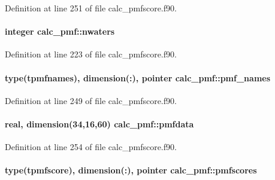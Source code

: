 Definition at line 251 of file calc\-\_\-pmfscore.\-f90.

\hypertarget{classcalc__pmf_a4232eda1705ffe1f555323f262740595}{
\paragraph[{nwaters}]{\setlength{\rightskip}{0pt plus 5cm}integer calc\-\_\-pmf\-::nwaters}}\label{classcalc__pmf_a4232eda1705ffe1f555323f262740595}


Definition at line 223 of file calc\-\_\-pmfscore.\-f90.

\hypertarget{classcalc__pmf_a78c8b146350fd4608bf9e835d768a391}{
\paragraph[{pmf\-\_\-names}]{\setlength{\rightskip}{0pt plus 5cm}type({\bf tpmfnames}), dimension(\-:), pointer calc\-\_\-pmf\-::pmf\-\_\-names}}\label{classcalc__pmf_a78c8b146350fd4608bf9e835d768a391}


Definition at line 249 of file calc\-\_\-pmfscore.\-f90.

\hypertarget{classcalc__pmf_ae432aff45faf03e082c4198c866338c7}{
\paragraph[{pmfdata}]{\setlength{\rightskip}{0pt plus 5cm}real, dimension(34,16,60) calc\-\_\-pmf\-::pmfdata}}\label{classcalc__pmf_ae432aff45faf03e082c4198c866338c7}


Definition at line 254 of file calc\-\_\-pmfscore.\-f90.

\hypertarget{classcalc__pmf_a908cf718c661183b9069614dad8c3ddd}{
\paragraph[{pmfscores}]{\setlength{\rightskip}{0pt plus 5cm}type({\bf tpmfscore}), dimension(\-:), pointer calc\-\_\-pmf\-::pmfscores}}\label{classcalc__pmf_a908cf718c661183b9069614dad8c3ddd}


